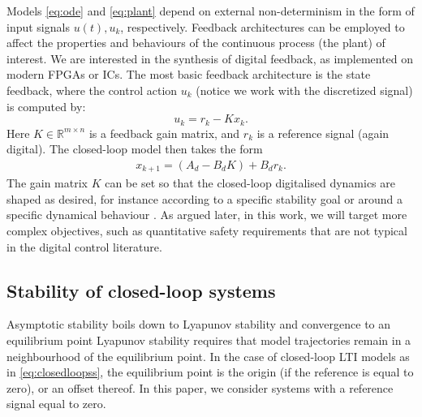\documentclass[runningheads,a4paper]{llncs}
\newcommand{\addtodo}[1]{{\color{red} TODO: #1}}
\begin{document}
Models \eqref{eq:ode} and \eqref{eq:plant} depend on external non-determinism in the form of input signals $u (t), u_k$, respectively. 
Feedback architectures can be employed to affect the properties and behaviours of the continuous process (the plant) of interest.   
We are interested in the synthesis of digital feedback, 
as implemented on modern FPGAs or ICs. 
The most basic feedback architecture is the state feedback, 
where the control action $u_k$ (notice we work with the discretized signal) is computed by: 
%
\begin{equation}
\label{eq:controlaction}
u_k = r_{k} - K x_k. 
\end{equation}
%
Here $K \in \mathbb{R}^{m \times n}$ is a feedback gain matrix, 
and $r_{k}$ is a reference signal (again digital).   
%
The closed-loop model then takes the form 
\begin{align}
\label{eq:closedloopss}
x_{k+1} = ( A_d - B_d K ) + B_d r_k.
\end{align}
The gain matrix $K$ can be set so that the closed-loop digitalised dynamics are shaped as desired, 
for instance according to a specific stability goal or around a specific dynamical behaviour \cite{astrom1997computer}. 
As argued later, in this work, we will target more complex objectives, such as quantitative safety requirements that are not typical in the digital control literature. 

\subsection{Stability of closed-loop systems}
\label{ssec:stability}


Asymptotic stability boils down to Lyapunov stability and convergence to an equilibrium point\cite{Astrom08} %
Lyapunov stability requires that model trajectories remain in a neighbourhood of the equilibrium point. 
In the case of closed-loop LTI models as in \eqref{eq:closedloopss}, 
the equilibrium point is the origin (if the reference is equal to zero), or an offset thereof.  
In this paper, we consider systems with a reference signal equal to zero. 
\end{document}
